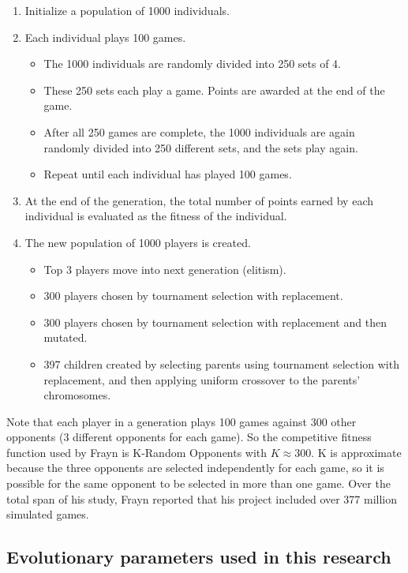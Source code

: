 \begin{enumerate}
  \item Initialize a population of 1000 individuals.
  \item Each individual plays 100 games.
  
  \begin {itemize}
    \item The 1000  individuals are randomly divided into 250 sets of 4.
    \item These 250 sets each play a game. Points are awarded at the end of the
    game.
    \item After all 250 games are complete, the 1000 individuals are again
    randomly divided into 250 different sets, and the sets play again.
    \item Repeat until each individual has played 100 games.
  \end{itemize}
  
  \item At the end of the generation, the total number of points earned by each
  individual is evaluated as the fitness of the individual.
  \item The new population of 1000 players is created.
  \begin{itemize}
    \item Top 3 players move into next generation (elitism).
    \item 300 players chosen by tournament selection with replacement.
    \item 300 players chosen by tournament selection with replacement and then
    mutated.
    \item 397 children created by selecting parents using tournament selection
    with replacement, and then applying uniform crossover to the parents'
    chromosomes.
  \end {itemize}
\end{enumerate}

Note that each player in a generation plays 100 games against 300 other
opponents (3 different opponents for each game). So the competitive fitness
function used by Frayn is K-Random Opponents with \(K\approx300\). K is
approximate because the three opponents are selected independently for each
game, so it is possible for the same opponent to be selected in more than one
game. Over the total span of his study, Frayn reported that his project
included over 377 million simulated games.

\subsection{Evolutionary parameters used in this research}

